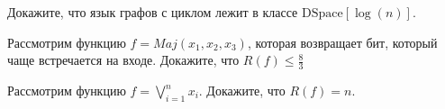 \begin{ptask}{43}
    Докажите, что язык графов с циклом лежит в классе $\mathrm{DSpace}[\log(n)]$.
\end{ptask}

\begin{ptask}{45}
    Рассмотрим функцию $f = Maj(x_1, x_2, x_3)$, которая возвращает бит, который чаще
    встречается на входе. Докажите, что $R(f) \le \frac{8}{3}$
\end{ptask}

\begin{ptask}{46}
    Рассмотрим функцию $f = \bigvee\limits_{i = 1}^{n} x_i$. Докажите, что $R(f) = n$.
\end{ptask}